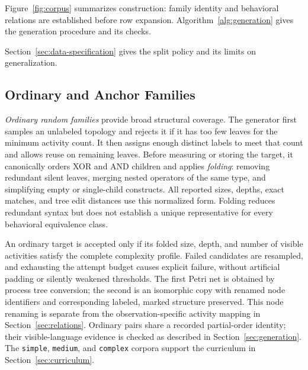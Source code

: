 \documentclass[mathematics,article,submit,moreauthors]{Definitions/mdpi}
\begin{document}
Figure~\ref{fig:corpus} summarizes construction: family identity and behavioral relations are established before row expansion. Algorithm~\ref{alg:generation} gives the generation procedure and its checks.



Section~\ref{sec:data-specification} gives the split policy and its limits on generalization.

\subsection{Ordinary and Anchor Families}\label{sec:anchor-families}

\emph{Ordinary random families} provide broad structural coverage. The generator first samples an unlabeled topology and rejects it if it has too few leaves for the minimum activity count. It then assigns enough distinct labels to meet that count and allows reuse on remaining leaves. Before measuring or storing the target, it canonically orders XOR and AND children and applies \emph{folding}: removing redundant silent leaves, merging nested operators of the same type, and simplifying empty or single-child constructs. All reported sizes, depths, exact matches, and tree edit distances use this normalized form. Folding reduces redundant syntax but does not establish a unique representative for every behavioral equivalence class.

An ordinary target is accepted only if its folded size, depth, and number of visible activities satisfy the complete complexity profile. Failed candidates are resampled, and exhausting the attempt budget causes explicit failure, without artificial padding or silently weakened thresholds. The first Petri net is obtained by process tree conversion; the second is an isomorphic copy with renamed node identifiers and corresponding labeled, marked structure preserved. This node renaming is separate from the observation-specific activity mapping in Section~\ref{sec:relations}. Ordinary pairs share a recorded partial-order identity; their visible-language evidence is checked as described in Section~\ref{sec:generation}. The \texttt{simple}, \texttt{medium}, and \texttt{complex} corpora support the curriculum in Section~\ref{sec:curriculum}.
\end{document}

